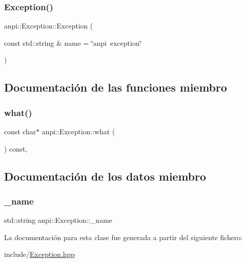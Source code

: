 \subsubsection{\texorpdfstring{Exception()}{Exception()}}
{\footnotesize\ttfamily anpi\+::\+Exception\+::\+Exception (\begin{DoxyParamCaption}\item[{const std\+::string \&}]{name = {\ttfamily \char`\"{}anpi~exception\char`\"{}} }\end{DoxyParamCaption})\hspace{0.3cm}{\ttfamily [inline]}}



\subsection{Documentación de las funciones miembro}
\mbox{\label{classanpi_1_1Exception_a58705160e813607d2ac15cfe0563aab0}} 
\subsubsection{\texorpdfstring{what()}{what()}}
{\footnotesize\ttfamily const char$\ast$ anpi\+::\+Exception\+::what (\begin{DoxyParamCaption}{ }\end{DoxyParamCaption}) const\hspace{0.3cm}{\ttfamily [inline]}, {\ttfamily [noexcept]}}



\subsection{Documentación de los datos miembro}
\mbox{\label{classanpi_1_1Exception_a02643d1cc10e5b41709aae76b2be5b08}} 
\subsubsection{\texorpdfstring{\+\_\+name}{\_name}}
{\footnotesize\ttfamily std\+::string anpi\+::\+Exception\+::\+\_\+name\hspace{0.3cm}{\ttfamily [private]}}



La documentación para esta clase fue generada a partir del siguiente fichero\+:\begin{DoxyCompactItemize}
\item 
include/\hyperlink{Exception_8hpp}{Exception.\+hpp}\end{DoxyCompactItemize}
